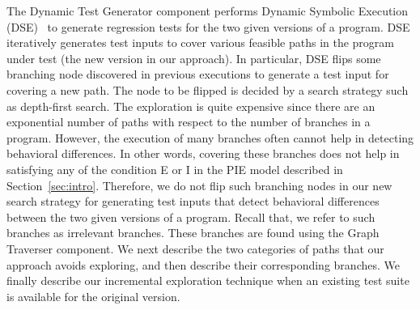 The Dynamic Test Generator component performs Dynamic Symbolic Execution (DSE)~\cite{Clarke:symbolic, king:symex, dart, cute, exe} to 
generate regression tests for the two given versions of a program. DSE iteratively generates test inputs to cover various feasible paths in the program under test (the new version in our approach). In particular, DSE flips some branching node discovered in previous executions to generate a test input for covering a new path. The node to be flipped is decided by a search strategy such as depth-first search. 
The exploration is quite expensive since there are an exponential 
number of paths with respect to the number of branches in a program.
 However, the execution of many branches often cannot help in detecting behavioral differences. 
 In other words, covering these branches does not help in satisfying any of the condition E or I in the PIE model described in Section~\ref{sec:intro}. 
 Therefore, we do not flip such branching nodes in our new search strategy for generating test inputs that detect 
 behavioral differences between the two given versions of a program. Recall that, we refer to such branches as irrelevant branches. These branches are found using the Graph Traverser component.
 We next describe the two categories of paths that our approach avoids exploring, and then describe their corresponding branches. We finally describe our incremental exploration technique when an existing test suite is available for the original version.
 
